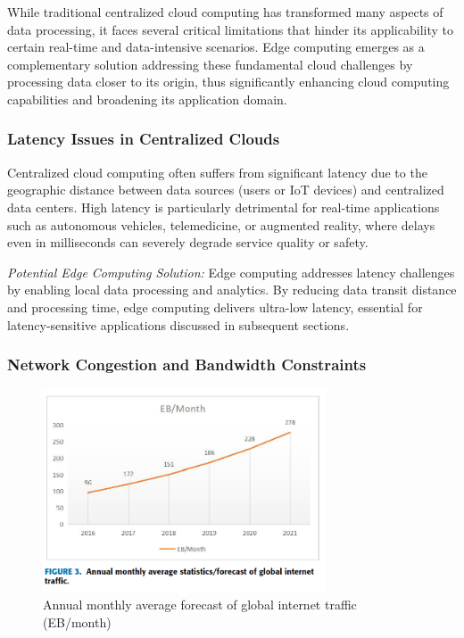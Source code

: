 \documentclass[runningheads]{llncs}
\begin{document}
While traditional centralized cloud computing has transformed many aspects of data processing, it faces several critical limitations that hinder its applicability to certain real-time and data-intensive scenarios. Edge computing emerges as a complementary solution addressing these fundamental cloud challenges by processing data closer to its origin, thus significantly enhancing cloud computing capabilities and broadening its application domain.

\subsubsection{Latency Issues in Centralized Clouds}
Centralized cloud computing often suffers from significant latency due to the geographic distance between data sources (users or IoT devices) and centralized data centers. High latency is particularly detrimental for real-time applications such as autonomous vehicles, telemedicine, or augmented reality, where delays even in milliseconds can severely degrade service quality or safety.

\textit{Potential Edge Computing Solution:} Edge computing addresses latency challenges by enabling local data processing and analytics. By reducing data transit distance and processing time, edge computing delivers ultra-low latency, essential for latency-sensitive applications discussed in subsequent sections.

\subsubsection{Network Congestion and Bandwidth Constraints}

\begin{figure}[h!]
    \centering
    \includegraphics[width=0.75\textwidth]{IMG/8.png}
    \caption{Annual monthly average forecast of global internet traffic (EB/month)}
    \label{fig:internet_traffic}
    \end{figure}   
\FloatBarrier %
\end{document}
